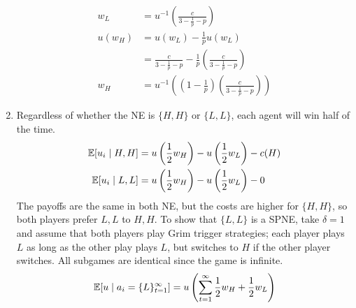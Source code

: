 \begin{enumerate}[label=\alph*)]
\begin{align*}
    w_L &= u^{-1} \left(\frac{c}{3 - \frac{1}{p} - p}\right)\\
    u(w_H) &= u(w_L) - \frac{1}{p} u(w_L)\\
                                                      &= \frac{c}{3 - \frac{1}{p} - p} - \frac{1}{p} \left(\frac{c}{3 - \frac{1}{p} - p}\right)\\
    w_H &= u^{-1} \left((1 - \frac{1}{p})\left(\frac{c}{3 - \frac{1}{p} - p}\right)\right)
  \end{align*}
\item Regardless of whether the NE is $\{H, H\}$ or $\{L, L\}$, each agent will win half of the time.
  \begin{align*}
    \mathbb{E}[u_i \mid H, H] &= u\left(\frac{1}{2} w_H\right) - u\left(\frac{1}{2} w_L\right) - c(H)\\
    \mathbb{E}[u_i \mid L, L] &= u\left(\frac{1}{2} w_H\right) - u\left(\frac{1}{2} w_L\right) - 0
  \end{align*}
  The payoffs are the same in both NE, but the costs are higher for $\{H, H\}$, so both players prefer $L, L$ to $H, H$. To show that $\{L, L\}$ is a SPNE, take $\delta = 1$ and assume that both players play Grim trigger strategies; each player plays $L$ as long as the other play plays $L$, but switches to $H$ if the other player switches. All subgames are identical since the game is infinite.
  \begin{align*}
    \E[u \mid a_i = \{L\}_{t = 1}^\infty] &= u \left(\sum^\infty_{t = 1} \frac{1}{2} w_H + \frac{1}{2} w_L\right)\\

\end{align*}
\end{enumerate}
